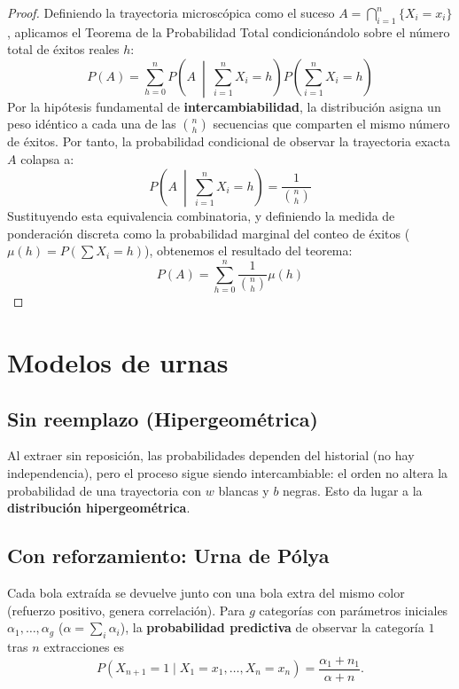 \documentclass[10pt]{book}
\begin{document}
\begin{proof}
Definiendo la trayectoria microscópica como el suceso $A = \bigcap_{i=1}^{n} \{X_i = x_i\}$, aplicamos el Teorema de la Probabilidad Total condicionándolo sobre el número total de éxitos reales $h$:
\begin{equation*}
    P(A) = \sum_{h=0}^{n} P\left(A \ \middle| \ \sum_{i=1}^{n} X_i = h\right) P\left(\sum_{i=1}^{n} X_i = h\right)
\end{equation*}
Por la hipótesis fundamental de \textbf{intercambiabilidad}, la distribución asigna un peso idéntico a cada una de las $\binom{n}{h}$ secuencias que comparten el mismo número de éxitos. Por tanto, la probabilidad condicional de observar la trayectoria exacta $A$ colapsa a:
\begin{equation*}
    P\left(A \ \middle| \ \sum_{i=1}^{n} X_i = h\right) = \frac{1}{\binom{n}{h}}
\end{equation*}
Sustituyendo esta equivalencia combinatoria, y definiendo la medida de ponderación discreta como la probabilidad marginal del conteo de éxitos ($\mu(h) = P(\sum X_i = h)$), obtenemos el resultado del teorema:
\begin{equation*}
    P(A) = \sum_{h=0}^{n} \frac{1}{\binom{n}{h}} \mu(h)
\end{equation*}
\end{proof}


\section{Modelos de urnas}
 
\subsection{Sin reemplazo (Hipergeométrica)}
Al extraer sin reposición, las probabilidades dependen del historial (no hay independencia), pero el proceso sigue siendo intercambiable: el orden no altera la probabilidad de una trayectoria con $w$ blancas y $b$ negras. Esto da lugar a la \textbf{distribución hipergeométrica}.
 
\subsection{Con reforzamiento: Urna de Pólya}
Cada bola extraída se devuelve junto con una bola extra del mismo color (refuerzo positivo, genera correlación). Para $g$ categorías con parámetros iniciales $\alpha_1,\dots,\alpha_g$ ($\alpha=\sum_i \alpha_i$), la \textbf{probabilidad predictiva} de observar la categoría $1$ tras $n$ extracciones es
\begin{equation*}
    P(X_{n+1}=1 \mid X_1=x_1,\dots,X_n=x_n) = \frac{\alpha_1+n_1}{\alpha+n}.
\end{equation*}
 
\end{document}
